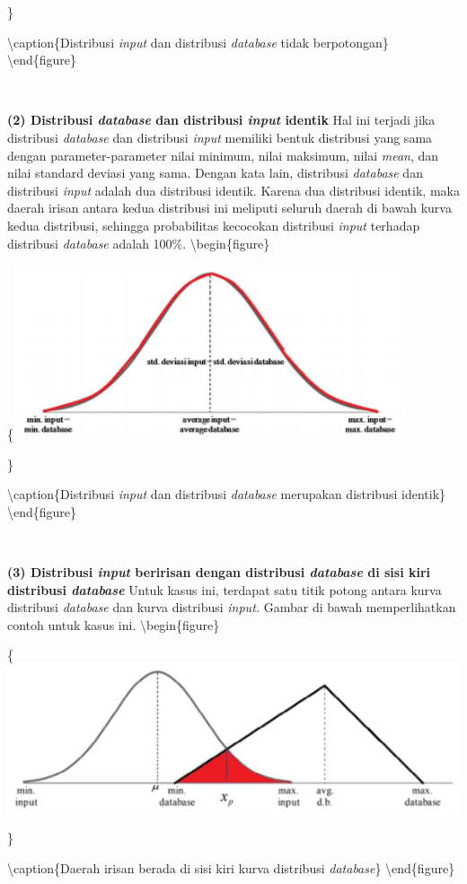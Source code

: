 \documentclass[
]{book}
\begin{document}
\}

\textbackslash caption\{Distribusi \emph{input} dan distribusi \emph{database} tidak berpotongan\}\label{fig:unnamed-chunk-33}
\textbackslash end\{figure\}

~

\textbf{(2) Distribusi \emph{database} dan distribusi \emph{input} identik}
Hal ini terjadi jika distribusi \emph{database} dan distribusi \emph{input} memiliki bentuk distribusi yang sama dengan parameter-parameter nilai minimum, nilai maksimum, nilai \emph{mean}, dan nilai standard deviasi yang sama. Dengan kata lain, distribusi \emph{database} dan distribusi \emph{input} adalah dua distribusi identik. Karena dua distribusi identik, maka daerah irisan antara kedua distribusi ini meliputi seluruh daerah di bawah kurva kedua distribusi, sehingga probabilitas kecocokan distribusi \emph{input} terhadap distribusi \emph{database} adalah 100\%.
\textbackslash begin\{figure\}

\{\centering \includegraphics[width=0.5\linewidth]{images/screening/distribusi_identik}

\}

\textbackslash caption\{Distribusi \emph{input} dan distribusi \emph{database} merupakan distribusi identik\}\label{fig:unnamed-chunk-34}
\textbackslash end\{figure\}

~

\textbf{(3) Distribusi \emph{input} beririsan dengan distribusi \emph{database} di sisi kiri distribusi \emph{database}}
Untuk kasus ini, terdapat satu titik potong antara kurva distribusi \emph{database} dan kurva distribusi \emph{input.} Gambar di bawah memperlihatkan contoh untuk kasus ini.
\textbackslash begin\{figure\}

\{\centering \includegraphics[width=0.5\linewidth]{images/screening/irisan1}

\}

\textbackslash caption\{Daerah irisan berada di sisi kiri kurva distribusi \emph{database}\}\label{fig:unnamed-chunk-35}
\textbackslash end\{figure\}
\end{document}
